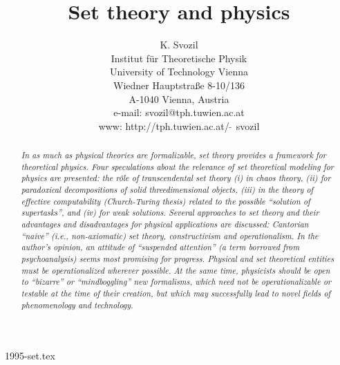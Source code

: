  \def\Bbb{\bf}



\title{Set theory and physics}
\author{K. Svozil\\
 {\small Institut f\"ur Theoretische Physik}  \\
  {\small University of Technology Vienna }     \\
  {\small Wiedner Hauptstra\ss e 8-10/136}    \\
  {\small A-1040 Vienna, Austria   }            \\
  {\small e-mail: svozil@tph.tuwien.ac.at}\\
  {\small www: http://tph.tuwien.ac.at/$\widetilde{\;\;}\,$svozil}}
\date{ }
\maketitle

\begin{flushright}
{\scriptsize 1995-set.tex}
\end{flushright}
\newpage

\begin{abstract}
{\em
In as much as physical theories are formalizable, set theory provides a
framework for theoretical physics.
Four speculations about the relevance of set theoretical modeling for
physics are presented: the r\^{o}le of
transcendental set theory (i) in chaos theory, (ii) for paradoxical
decompositions of solid threedimensional objects,
 (iii) in
the theory of effective computability (Church-Turing thesis) related to
the possible
``solution of supertasks'', and (iv) for weak solutions.
Several approaches to set theory and their advantages and disadvantages
for physical applications are discussed: Cantorian
``naive'' (i.e., non-axiomatic) set theory, constructivism
and operationalism.
In the author's opinion, an attitude of ``suspended attention'' (a
term borrowed from psychoanalysis) seems most promising for progress.
Physical and set theoretical entities
must be operationalized
wherever possible. At the same time, physicists should be open to
``bizarre'' or ``mindboggling'' new formalisms,
which need not be operationalizable or testable at the time of their
creation, but which may successfully lead to novel fields of
phenomenology and technology.
}
\end{abstract}


